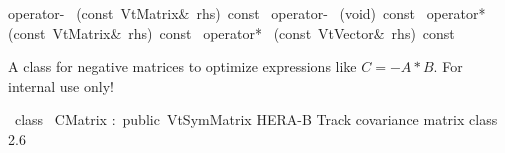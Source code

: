 \documentclass{article}
\begin{document}
\begin{cxxentry}
\begin{cxxclass}
\begin{cxxpublic}
        {operator-\ }
        {(const\ VtMatrix\&\ rhs)\ const\ }
        {}
        {}
\label{cxx.2.5.18}
        {operator-\ }
        {(void)\ const\ }
        {}
        {}
\label{cxx.2.5.19}
        {operator*\ }
        {(const\ VtMatrix\&\ rhs)\ const\ }
        {}
        {}
\label{cxx.2.5.20}
        {operator*\ }
        {(const\ VtVector\&\ rhs)\ const\ }
        {}
        {}
\label{cxx.2.5.21}
\end{cxxpublic}
\begin{cxxdoc}
A class for negative matrices to optimize expressions like
$C = -A * B$. For internal use only!

\end{cxxdoc}
\end{cxxclass}
\begin{cxxclass}
{\ class\ }
        {CMatrix}
        {:\ public\ VtSymMatrix}
        {HERA-B Track covariance matrix class}
        {2.6}
\begin{cxxInheritance}

\end{cxxInheritance}
\end{cxxclass}
\end{cxxentry}
\end{document}
